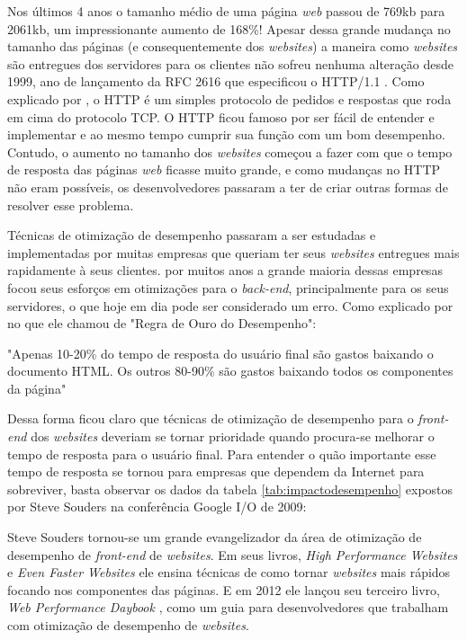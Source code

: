 Nos últimos 4 anos o tamanho médio de uma página \textit{web} passou de 769kb para 2061kb, um impressionante aumento de 168\%! Apesar dessa grande mudança no tamanho das páginas (e consequentemente dos \textit{websites}) a maneira como \textit{websites} são entregues dos servidores para os clientes não sofreu nenhuma alteração desde 1999, ano de lançamento da RFC 2616 que especificou o HTTP/1.1 \cite{RFC2616}. Como explicado por \cite{Tanenbaum}, o HTTP é um simples protocolo de pedidos e respostas que roda em cima do protocolo TCP. O HTTP ficou famoso por ser fácil de entender e implementar e ao mesmo tempo cumprir sua função com um bom desempenho. Contudo, o aumento no tamanho dos \textit{websites} começou a fazer com que o tempo de resposta das páginas \textit{web} ficasse muito grande, e como mudanças no HTTP não eram possíveis, os desenvolvedores passaram a ter de criar outras formas de resolver esse problema.

Técnicas de otimização de desempenho passaram a ser estudadas e implementadas por muitas empresas que queriam ter seus \textit{websites} entregues mais rapidamente à seus clientes. por muitos anos a grande maioria dessas empresas focou seus esforços em otimizações para o \textit{back-end}, principalmente para os seus servidores, o que hoje em dia pode ser considerado um erro. Como explicado por \cite{HighPerformance} no que ele chamou de "Regra de Ouro do Desempenho":

\begin{citacao}
"Apenas 10-20\% do tempo de resposta do usuário final são gastos baixando o documento HTML. Os outros 80-90\% são gastos baixando todos os componentes da página"
\end{citacao}

Dessa forma ficou claro que técnicas de otimização de desempenho para o \textit{front-end} dos \textit{websites} deveriam se tornar prioridade quando procura-se melhorar o tempo de resposta para o usuário final. Para entender o quão importante esse tempo de resposta se tornou para empresas que dependem da Internet para sobreviver, basta observar os dados da tabela \autoref{tab:impactodesempenho} expostos por Steve Souders na conferência Google I/O de 2009:



Steve Souders tornou-se um grande evangelizador da área de otimização de desempenho de \textit{front-end} de \textit{websites}. Em seus livros, \textit{High Performance Websites} \cite{HighPerformance} e \textit{Even Faster Websites} \cite{EvenFaster} ele ensina técnicas de como tornar \textit{websites} mais rápidos focando nos componentes das páginas. E em 2012 ele lançou seu terceiro livro, \textit{Web Performance Daybook} \cite{WebPerformance}, como um guia para desenvolvedores que trabalham com otimização de desempenho de \textit{websites}.

